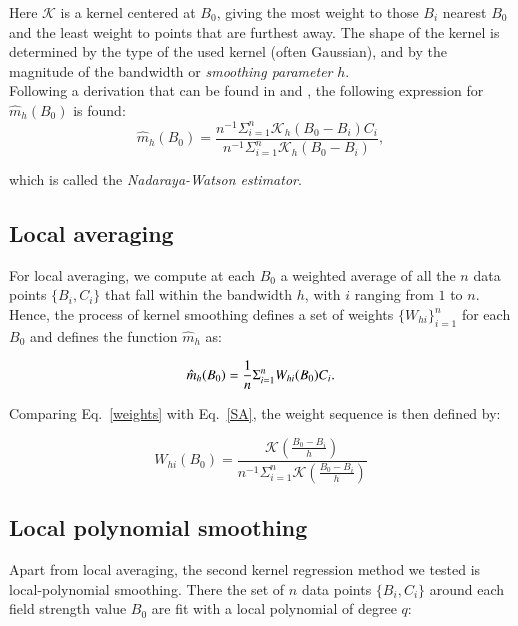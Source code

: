 \documentclass[goettingen, gauss, print]{thesis}
\begin{document}
Here $\mathcal{K}$ is a kernel centered at $B_0$, giving the most weight to those $B_i$ nearest $B_0$ and the least weight to points that are furthest away. The shape of the kernel is determined by the type of the used kernel (often Gaussian), and by the magnitude of the bandwidth or \textit{smoothing parameter} $h$.
\\


Following a derivation that can be found in \cite{nadaraya_estimating_1964} and \cite{watson_smooth_1964}, the following expression for $\hat{m}_h(B_0)$ is found:
\begin{equation}
\hat{m}_h(B_0) = \frac{n^{-1}\Sigma_{i=1}^{n} \mathcal{K}_{h}(B_0-B_i)C_i}{n^{-1} \Sigma_{i=1}^{n}\mathcal{K}_{h}(B_0-B_i)},
\label{SA}
\end{equation}

which is called the \textit{Nadaraya-Watson estimator}.
\\
\subsection{Local averaging}

For local averaging, we compute at each $B_0$ a weighted average of all the $n$ data points $\{B_i,C_i\}$ that fall within the bandwidth $h$, with $i$ ranging from $1$ to $n$. Hence, the process of kernel smoothing defines a set of weights $\{W_{hi}\}_{i=1}^{n}$ for each $B_0$ and defines the function $\hat{m}_h$ as:

\begin{equation}
\hat{m}_h(B_0) = \frac{1}{n} \Sigma_{i=1}^{n} W_{hi} (B_0) C_i \\.
\label{weights}
\end{equation}

Comparing Eq.~\ref{weights} with Eq.~\ref{SA}, the weight sequence is then defined by:

\begin{equation}
W_{hi} (B_0) = \frac{\mathcal{K}(\frac{B_0-B_i}{h})}{n^{-1} \Sigma_{i=1}^{n}\mathcal{K}(\frac{B_0-B_i}{h})}
\end{equation}


\subsection{Local polynomial smoothing}
Apart from local averaging, the second kernel regression method we tested is local-polynomial smoothing. There the set of $n$ data points $\{B_i,C_i\}$ around each field strength value $B_0$ are fit with a local polynomial of degree $q$:
\end{document}
